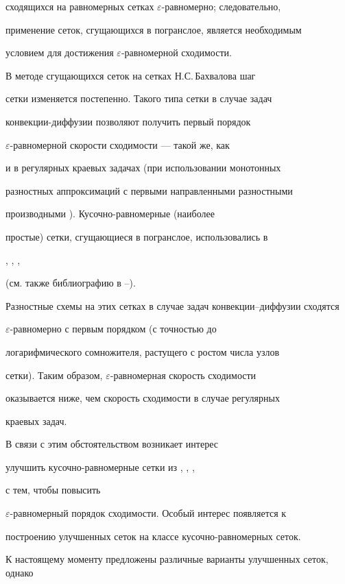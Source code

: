 сходящихся на равномерных сетках $\varepsilon$-равномерно; следовательно,


применение сеток, сгущающихся в погранслое, является необходимым


условием для достижения $\varepsilon$-равномерной сходимости.





В методе сгущающихся сеток на сетках Н.С.\,Бахвалова \cite{3} шаг


сетки изменяется постепенно. Такого типа сетки в случае задач


конвекции-диффузии позволяют получить первый порядок


$\varepsilon$-равномерной скорости сходимости \cite{11} --- такой же, как


и в регулярных краевых задачах (при использовании монотонных


разностных аппроксимаций с первыми направленными разностными


производными \cite{2}). Кусочно-равномерные (наиболее


простые) сетки, сгущающиеся в погранслое, использовались в


\cite{6}, \cite{7}, \cite{CRC}, \cite{12}


(см. также библиографию в \cite{6}--\cite{CRC}).


Разностные схемы на этих сетках в случае задач конвекции--диффузии сходятся


$\varepsilon$-равномерно с первым порядком (с точностью до


логарифмического сомножителя, растущего с ростом числа узлов


сетки). Таким образом, $\varepsilon$-равномерная скорость сходимости


оказывается ниже, чем скорость сходимости в случае регулярных


краевых задач.





В связи с этим обстоятельством возникает интерес


улучшить кусочно-равномерные сетки из \cite{6}, \cite{7}, \cite{CRC},


\cite{12} с тем, чтобы повысить


$\varepsilon$-равномерный порядок сходимости. Особый интерес появляется к


построению улучшенных сеток на классе кусочно-равномерных сеток.


К настоящему моменту предложены различные варианты улучшенных сеток, однако


